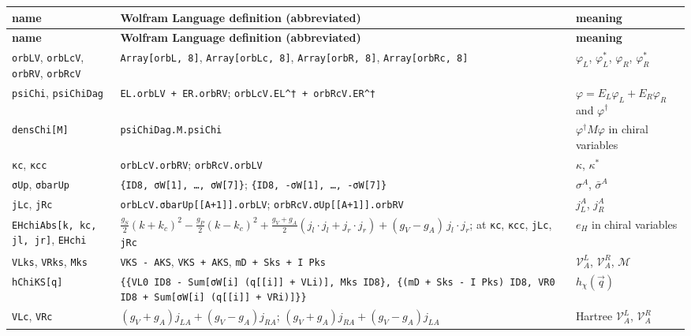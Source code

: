 \documentclass[10pt,a4paper]{article}
\begin{document}
{\footnotesize
\begin{longtable}{>{\raggedright\arraybackslash}p{}>{\raggedright\arraybackslash}p{}>{\raggedright\arraybackslash}p{}}
\toprule
\textbf{name} & \textbf{Wolfram Language definition (abbreviated)} & \textbf{meaning} \\
\midrule\endfirsthead
\toprule
\textbf{name} & \textbf{Wolfram Language definition (abbreviated)} & \textbf{meaning} \\
\midrule\endhead
\endfoot
\bottomrule\endlastfoot
\texttt{orbLV}, \texttt{orbLcV}, \texttt{orbRV}, \texttt{orbRcV} & \texttt{Array[orbL, 8]}, \texttt{Array[orbLc, 8]}, \texttt{Array[orbR, 8]}, \texttt{Array[orbRc, 8]} & $\varphi_L$, $\varphi_L^*$, $\varphi_R$, $\varphi_R^*$ \\
\texttt{psiChi}, \texttt{psiChiDag} & \texttt{EL.orbLV + ER.orbRV}; \texttt{orbLcV.EL\textasciicircum{}† + orbRcV.ER\textasciicircum{}†} & $\varphi=E_L\varphi_L+E_R\varphi_R$ and $\varphi^\dagger$ \\
\texttt{densChi[M]} & \texttt{psiChiDag.M.psiChi} & $\varphi^\dagger M\varphi$ in chiral variables \\
\texttt{κc}, \texttt{κcc} & \texttt{orbLcV.orbRV}; \texttt{orbRcV.orbLV} & $\kappa$, $\kappa^*$ \\
\texttt{σUp}, \texttt{σbarUp} & \texttt{\{ID8, σW[1], …, σW[7]\}}; \texttt{\{ID8, -σW[1], …, -σW[7]\}} & $\sigma^A$, $\bar\sigma^A$ \\
\texttt{jLc}, \texttt{jRc} & \texttt{orbLcV.σbarUp[[A+1]].orbLV}; \texttt{orbRcV.σUp[[A+1]].orbRV} & $j_L^A$, $j_R^A$ \\
\texttt{EHchiAbs[k, kc, jl, jr]}, \texttt{EHchi} & $\frac{g_S}2(k+k_c)^2-\frac{g_P}2(k-k_c)^2+\frac{g_V+g_A}2(j_l\cdot j_l+j_r\cdot j_r)+(g_V-g_A)\,j_l\cdot j_r$; at \texttt{κc}, \texttt{κcc}, \texttt{jLc}, \texttt{jRc} & $e_H$ in chiral variables \\
\texttt{VLks}, \texttt{VRks}, \texttt{Mks} & \texttt{VKS - AKS}, \texttt{VKS + AKS}, \texttt{mD + Sks + I Pks} & $\mathcal V^L_A$, $\mathcal V^R_A$, $\mathcal M$ \\
\texttt{hChiKS[q]} & \texttt{\{\{VL0 ID8 - Sum[σW[i] (q[[i]] + VLi)], Mks ID8\}, \{(mD + Sks - I Pks) ID8, VR0 ID8 + Sum[σW[i] (q[[i]] + VRi)]\}\}} & $h_\chi(\vec q)$ \\
\texttt{VLc}, \texttt{VRc} & $(g_V+g_A)j_{LA}+(g_V-g_A)j_{RA}$; $(g_V+g_A)j_{RA}+(g_V-g_A)j_{LA}$ & Hartree $\mathcal V^L_A$, $\mathcal V^R_A$ \\

\end{longtable}}
\end{document}

